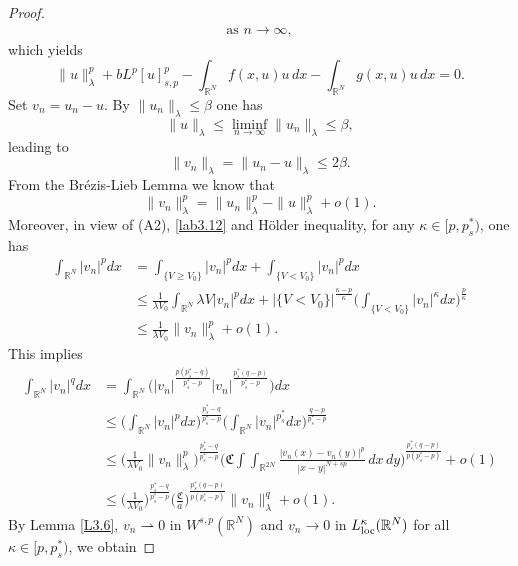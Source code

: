 \documentclass[reqno]{amsart}
\begin{document}
\begin{proof}
\begin{align*}
  \text{as } n\to \infty,
\end{align*}
which yields
\begin{equation}\label{lab3.16}
\|u\|^p_\lambda+bL^p[u]^p_{s,p} -\int_{\mathbb{R}^N}f(x,u)u\,dx
-\int_{\mathbb{R}^N}g(x,u)u\,dx=0.
\end{equation}
Set $v_n=u_n-u$. By $\|u_n\|_\lambda\leq \beta$ one has
\[
\|u\|_\lambda \leq \liminf_{n\to \infty}\|u_n\|_\lambda\leq\beta,
\]
leading to
\begin{equation}\label{lab3.17}
\|v_n\|_\lambda=\|u_n-u\|_\lambda\leq 2\beta.
\end{equation}
From the Br\'{e}zis-Lieb Lemma \cite{r3} we know that
\begin{equation}\label{lab3.18}
\|v_n\|^p_\lambda=\|u_n\|^p_\lambda-\|u\|^p_\lambda+o(1).
\end{equation}
Moreover, in view of (A2), \eqref{lab3.12} and H\"older inequality,
for any $\kappa\in[p, p^*_s)$, one has
\begin{align*}
\int_{\mathbb{R}^N}|v_n|^pdx
&=\int_{\{V\geq V_0\}}|v_n|^pdx+\int_{\{V<V_0\}}|v_n|^pdx      \\
&\leq \frac{1}{\lambda V_0}\int_{\mathbb{R}^N}\lambda V|v_n|^pdx
 +|{\{V<V_0\}}|^{\frac{\kappa-p}{\kappa}}
 \Big(\int_{\{V<V_0\}}|v_n|^\kappa dx\Big)^{\frac{p}{\kappa}}   \\
&\leq \frac{1}{\lambda V_0}\|v_n\|^p_\lambda+o(1).
\end{align*}
This implies
\begin{equation}\label{lab3.19}
\begin{split}
\int_{\mathbb{R}^N}|v_n|^q dx
&=  \int_{\mathbb{R}^N}\Big(|v_n|^{\frac{p(p_s^*-q)}{p_s^*-p}}
 |v_n|^{\frac{p_s^*(q-p)}{p_s^*-p}}\Big)dx \\
&\leq  \Big(\int_{\mathbb{R}^N}|v_n|^pdx\Big)^{\frac{p_s^*-q}{p_s^*-p}} 
 \Big(\int_{\mathbb{R}^N}|v_n|^{p_s^*} dx \Big)^{\frac{q-p}{p_s^*-p}}  \\
&\leq   \Big(\frac{1}{\lambda V_0}\|v_n\|^p_\lambda \Big)^{\frac{p_s^*-q}{p_s^*-p}}
 \Big(\mathfrak{C}\int\int_{\mathbb{R}^{2N}}\frac{|v_n(x)-v_n(y)|^p}{|x-y|^{N+sp}}\,dx\,dy\Big)^{\frac{p_s^*(q-p)}{p(p_s^*-p)}}+o(1)  \\
&\leq   \Big(\frac{1}{\lambda V_0}\Big)^{\frac{p_s^*-q}{p_s^*-p}}
 \Big(\frac{\mathfrak{C}}{a}\Big)^{\frac{p_s^*(q-p)}{p(p_s^*-p)}}\|v_n\|^q_\lambda+o(1).
\end{split}
\end{equation}
By Lemma \ref{L3.6}, $v_n\rightharpoonup0$ in $W^{s,p}(\mathbb{R}^N)$ and $v_n\to  0$ 
in $L^\kappa_{\rm loc}(\mathbb{R}^N)$ for all $\kappa\in[p,p_s^*)$, we obtain

\end{proof}
\end{document}
